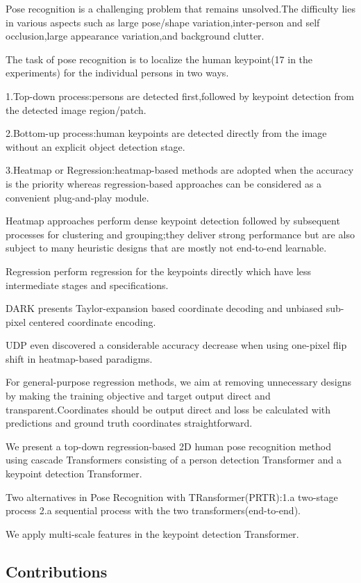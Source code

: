 \documentclass[11pt]{article}
\begin{document}
Pose recognition is a challenging problem that remains unsolved.The difficulty lies in various aspects such as large pose/shape variation,inter-person and self occlusion,large appearance variation,and background clutter.

The task of pose recognition is to localize the human keypoint(17 in the experiments) for the individual persons in two ways.

1.Top-down process:persons are detected first,followed by keypoint detection from the detected image region/patch.

2.Bottom-up process:human keypoints are detected directly from the image without an explicit object detection stage.

3.Heatmap or Regression:heatmap-based methods are adopted when the accuracy is the priority whereas regression-based approaches can be considered as a convenient plug-and-play module.

Heatmap approaches perform dense keypoint detection followed by subsequent processes for clustering and grouping;they deliver strong performance but are also subject to many heuristic designs that are mostly not end-to-end learnable.

Regression perform regression for the keypoints directly which have less intermediate stages and specifications.

DARK presents Taylor-expansion based coordinate decoding and unbiased sub-pixel centered coordinate encoding.

UDP even discovered a considerable accuracy decrease when using one-pixel flip shift in heatmap-based paradigms.

For general-purpose regression methods, we aim at removing unnecessary designs by making the training objective and target output direct and transparent.Coordinates should be output direct and loss be calculated with predictions and ground truth coordinates straightforward.

We present a top-down regression-based 2D human pose recognition method using cascade Transformers consisting of a person detection Transformer and a keypoint detection Transformer.

Two alternatives in Pose Recognition with TRansformer(PRTR):1.a two-stage process 2.a sequential process with the two transformers(end-to-end).

We apply multi-scale features in the keypoint detection Transformer.

\subsection{Contributions}
\end{document}
